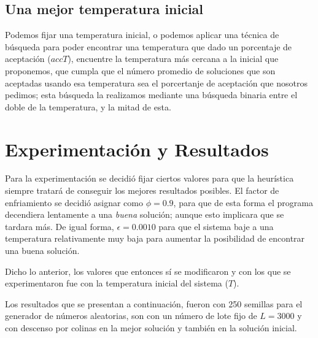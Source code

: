 \documentclass{article}
\newcommand{\tit}[1]{\textit{#1}}
\begin{document}
  \subsection{Una mejor temperatura inicial}
  Podemos fijar una temperatura inicial, o podemos aplicar una
  técnica de búsqueda para poder encontrar una temperatura
  que dado un porcentaje de aceptación ($accT$), encuentre la 
  temperatura más cercana a la inicial que proponemos, que cumpla 
  que el número promedio de soluciones que son aceptadas usando 
  esa temperatura sea el porcertanje de aceptación 
  que nosotros pedimos; esta búsqueda la realizamos mediante
  una búsqueda binaria entre el doble de la temperatura, y la 
  mitad de esta.

  \section{Experimentación y Resultados} \label{results}
  Para la experimentación se decidió fijar ciertos valores para
  que la heurística siempre tratará de conseguir los mejores 
  resultados posibles. El factor de enfriamiento se decidió 
  asignar como $\phi = 0.9$, para que de esta forma el programa 
  decendiera lentamente a una \tit{buena} solución; aunque
  esto implicara que se tardara más. De igual forma, 
  $\epsilon = 0.0010$ para que el sistema baje a una temperatura 
  relativamente muy baja para aumentar la posibilidad de encontrar
  una buena solución.

  Dicho lo anterior, los valores que entonces sí se modificaron 
  y con los que se experimentaron fue con la temperatura inicial 
  del sistema ($T$).

  Los resultados que se presentan a continuación, fueron con 
  250 semillas para el generador de números aleatorias, son con 
  un número de lote fijo de $L = 3000$ y con descenso por 
  colinas en la mejor solución y también en la solución inicial.
\end{document}

